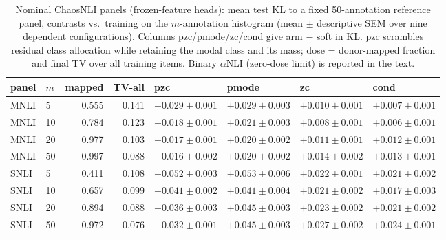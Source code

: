 \begin{table}[t]\centering\footnotesize\setlength{\tabcolsep}{3pt}
\caption{Nominal ChaosNLI panels (frozen-feature heads): mean test KL to a fixed 50-annotation reference panel, contrasts vs.\ training on the $m$-annotation histogram (mean $\pm$ descriptive SEM over nine dependent configurations). Columns pzc/pmode/zc/cond give arm $-$ soft in KL. pzc scrambles residual class allocation while retaining the modal class and its mass; dose = donor-mapped fraction and final TV over all training items. Binary $\alpha$NLI (zero-dose limit) is reported in the text.}
\label{tab:nominal}
\begin{tabular}{llrrllll}\toprule
panel & $m$ & mapped & TV-all & pzc & pmode & zc & cond \\ \midrule
MNLI & 5 & 0.555 & 0.141 & $+0.029\pm0.001$ & $+0.029\pm0.003$ & $+0.010\pm0.001$ & $+0.007\pm0.001$ \\
MNLI & 10 & 0.784 & 0.123 & $+0.018\pm0.001$ & $+0.021\pm0.003$ & $+0.008\pm0.001$ & $+0.006\pm0.001$ \\
MNLI & 20 & 0.977 & 0.103 & $+0.017\pm0.001$ & $+0.020\pm0.002$ & $+0.011\pm0.001$ & $+0.012\pm0.001$ \\
MNLI & 50 & 0.997 & 0.088 & $+0.016\pm0.002$ & $+0.020\pm0.002$ & $+0.014\pm0.002$ & $+0.013\pm0.001$ \\
SNLI & 5 & 0.411 & 0.108 & $+0.052\pm0.003$ & $+0.053\pm0.006$ & $+0.022\pm0.001$ & $+0.021\pm0.002$ \\
SNLI & 10 & 0.657 & 0.099 & $+0.041\pm0.002$ & $+0.041\pm0.004$ & $+0.021\pm0.002$ & $+0.017\pm0.003$ \\
SNLI & 20 & 0.894 & 0.088 & $+0.036\pm0.003$ & $+0.045\pm0.003$ & $+0.023\pm0.002$ & $+0.021\pm0.002$ \\
SNLI & 50 & 0.972 & 0.076 & $+0.032\pm0.001$ & $+0.045\pm0.003$ & $+0.027\pm0.002$ & $+0.024\pm0.001$ \\
\bottomrule\end{tabular}\end{table}
